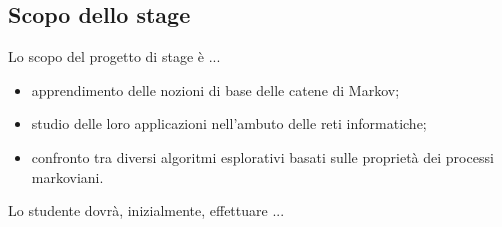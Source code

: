 
\subsection{Scopo dello stage}
	Lo scopo del progetto di stage è ...
	\begin{itemize}
		\item apprendimento delle nozioni di base delle catene di Markov;
		\item studio delle loro applicazioni nell'ambuto delle reti informatiche;
		\item confronto tra diversi algoritmi esplorativi basati sulle proprietà dei processi markoviani.
	\end{itemize}
	\newline
	Lo studente dovrà, inizialmente, effettuare ...
